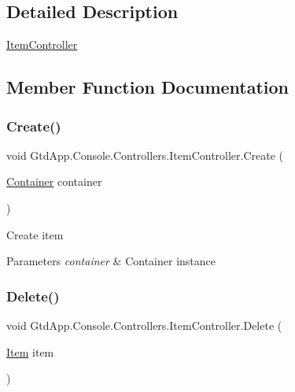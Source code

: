 \subsection{Detailed Description}
\mbox{\hyperlink{class_gtd_app_1_1_console_1_1_controllers_1_1_item_controller}{Item\+Controller}} 



\subsection{Member Function Documentation}
\mbox{\label{class_gtd_app_1_1_console_1_1_controllers_1_1_item_controller_a79bc2af271cbcc374eaaabe4e289b543}} 
\subsubsection{\texorpdfstring{Create()}{Create()}}
{\footnotesize\ttfamily void Gtd\+App.\+Console.\+Controllers.\+Item\+Controller.\+Create (\begin{DoxyParamCaption}\item[{\mbox{\hyperlink{class_gtd_app_1_1_data_1_1_container}{Container}}}]{container }\end{DoxyParamCaption})}



Create item 


\begin{DoxyParams}{Parameters}
{\em container} & Container instance\\
\hline
\end{DoxyParams}
\mbox{\label{class_gtd_app_1_1_console_1_1_controllers_1_1_item_controller_a8138642f8999b16a5ceb3cd3e2899ffc}} 
\subsubsection{\texorpdfstring{Delete()}{Delete()}}
{\footnotesize\ttfamily void Gtd\+App.\+Console.\+Controllers.\+Item\+Controller.\+Delete (\begin{DoxyParamCaption}\item[{\mbox{\hyperlink{class_gtd_app_1_1_data_1_1_item}{Item}}}]{item }\end{DoxyParamCaption})}



